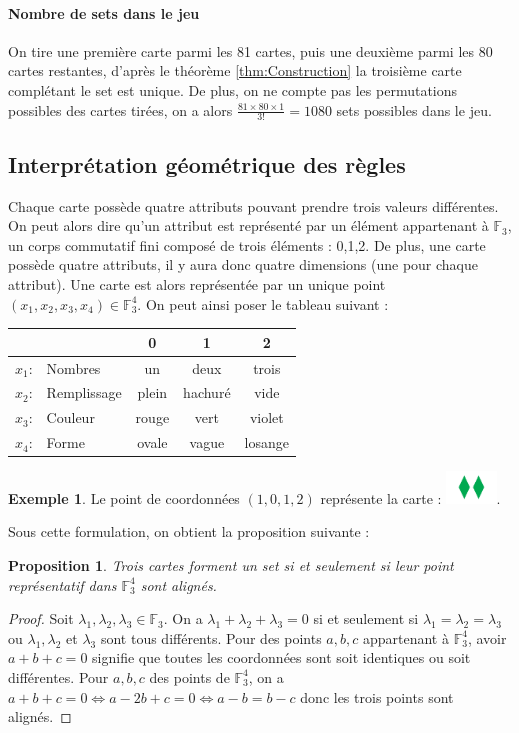 \documentclass[a4paper,12pt,titlepage]{article}
\theoremstyle{plain}
\newtheorem{prop}{Proposition}
\theoremstyle{definition}
\newtheorem{ex}{Exemple}
\newcommand{\Ftrois}[1]{\mathbb{F}^#1_3}
\begin{document}
\paragraph{Nombre de sets dans le jeu} On tire une première carte parmi les 81 cartes, puis une deuxième parmi les 80 cartes restantes, d'après le théorème \ref{thm:Construction} la troisième carte complétant le set est unique. 
De plus, on ne compte pas les permutations possibles des cartes tirées, on a alors $\frac{81 \times 80 \times 1}{3!} = 1080$ sets possibles dans le jeu.

\subsection{Interprétation géométrique des règles}
Chaque carte possède quatre attributs pouvant prendre trois valeurs différentes. On peut alors dire qu'un attribut est représenté par un élément appartenant  à $\mathbb{F}_3$, un corps commutatif fini composé de trois éléments : 0,1,2.
De plus, une carte possède quatre attributs, il y aura donc quatre dimensions (une pour chaque attribut). Une carte est alors représentée par un unique point $(x_1,x_2,x_3,x_4) \in \Ftrois{4}$.
On peut ainsi poser le tableau suivant :

\begin{center}
  \begin{tabular}{r l | c c c }
    & & 0 & 1 & 2 \\
    \hline
    $x_1$: & Nombres     & un		& deux	  & trois 	\\
    $x_2$: & Remplissage & plein 	& hachuré & vide 	\\
    $x_3$: & Couleur     & rouge	& vert	  & violet 	\\
    $x_4$: & Forme       & ovale	& vague	  & losange \\
  \end{tabular}
\end{center}

\begin{ex}
  Le point de coordonnées $(1,0,1,2)$ représente la carte : \includegraphics[width=0.1\textwidth]{1012.png}.
\end{ex}

\noindent Sous cette formulation, on obtient la proposition suivante :
\begin{prop}
  Trois cartes forment un set si et seulement si leur point représentatif dans  $\Ftrois{4}$ sont alignés.
\end{prop}
\begin{proof}
  Soit $\lambda_1,\lambda_2,\lambda_3 \in \mathbb{F}_3$. On a $\lambda_1 + \lambda_2 + \lambda_3 = 0$ si et seulement si $\lambda_1=\lambda_2=\lambda_3$ ou $\lambda_1,\lambda_2$ et $\lambda_3$ sont tous différents. Pour des points $a,b,c$ appartenant à  $\Ftrois{4}$, avoir $a+b+c=0$ signifie que toutes les coordonnées sont soit identiques ou soit différentes.
  Pour $a,b,c$ des points de  $\Ftrois{4}$, on a $a+b+c=0 \iff a-2b+c=0 \iff a-b=b-c$ donc les trois points sont alignés.
\end{proof}
\end{document}
